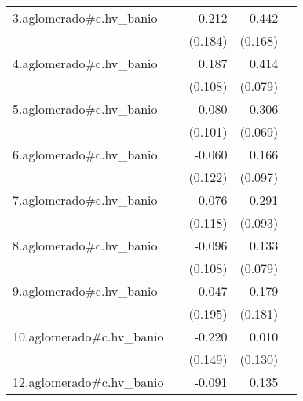 {\begin{longtable}{l*{4}{D{.}{.}{-1}}}
\addlinespace
3.aglomerado#c.hv\_banio&                     &       0.212         &       0.442\sym{**} &                     \\
            &                     &     (0.184)         &     (0.168)         &                     \\
\addlinespace
4.aglomerado#c.hv\_banio&                     &       0.187         &       0.414\sym{***}&                     \\
            &                     &     (0.108)         &     (0.079)         &                     \\
\addlinespace
5.aglomerado#c.hv\_banio&                     &       0.080         &       0.306\sym{***}&                     \\
            &                     &     (0.101)         &     (0.069)         &                     \\
\addlinespace
6.aglomerado#c.hv\_banio&                     &      -0.060         &       0.166         &                     \\
            &                     &     (0.122)         &     (0.097)         &                     \\
\addlinespace
7.aglomerado#c.hv\_banio&                     &       0.076         &       0.291\sym{**} &                     \\
            &                     &     (0.118)         &     (0.093)         &                     \\
\addlinespace
8.aglomerado#c.hv\_banio&                     &      -0.096         &       0.133         &                     \\
            &                     &     (0.108)         &     (0.079)         &                     \\
\addlinespace
9.aglomerado#c.hv\_banio&                     &      -0.047         &       0.179         &                     \\
            &                     &     (0.195)         &     (0.181)         &                     \\
\addlinespace
10.aglomerado#c.hv\_banio&                     &      -0.220         &       0.010         &                     \\
            &                     &     (0.149)         &     (0.130)         &                     \\
\addlinespace
12.aglomerado#c.hv\_banio&                     &      -0.091         &       0.135         &                     \\

\end{longtable}}
